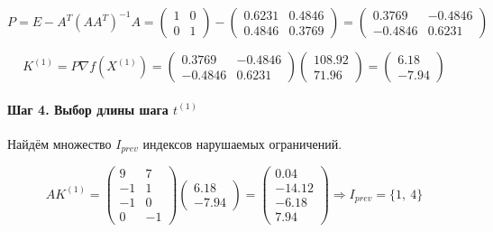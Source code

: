 \begin{equation*}
P = E - A^T \left(A A^T\right)^{-1} A = \begin{pmatrix} 1 & 0 \\ 0 & 1 \end{pmatrix} - \begin{pmatrix} 0.6231 & 0.4846 \\ 0.4846 & 0.3769 \end{pmatrix} = \begin{pmatrix} 0.3769 & -0.4846 \\ -0.4846 & 0.6231 \end{pmatrix}
\end{equation*}

\begin{equation*}
	K^{(1)} = P \nabla f(X^{(1)}) = \begin{pmatrix} 0.3769 & -0.4846 \\ -0.4846 & 0.6231 \end{pmatrix} \begin{pmatrix} 108.92 \\ 71.96 \end{pmatrix} = \begin{pmatrix} 6.18 \\ -7.94 \end{pmatrix}
\end{equation*}

\paragraph{Шаг 4. Выбор длины шага $t^{(1)}$}

Найдём множество $I_{prev}$ индексов нарушаемых ограничений.

\begin{equation*}
	A K^{(1)} = \begin{pmatrix}
		9 & 7
		\\
		-1 & 1
		\\
		-1 & 0
		\\
		0 & -1
	\end{pmatrix}
	\begin{pmatrix} 6.18 \\ -7.94 \end{pmatrix}
	=
	\begin{pmatrix}
		0.04 \\ -14.12 \\ -6.18 \\ 7.94
	\end{pmatrix}
	\Rightarrow I_{prev} = \{1,\ 4\}
\end{equation*}

